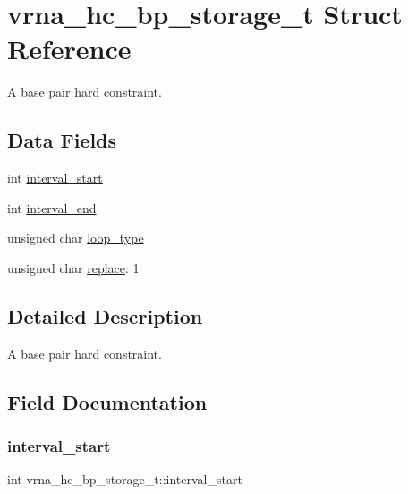 \hypertarget{structvrna__hc__bp__storage__t}{}\section{vrna\+\_\+hc\+\_\+bp\+\_\+storage\+\_\+t Struct Reference}
\label{structvrna__hc__bp__storage__t}


A base pair hard constraint.  


\subsection*{Data Fields}
\begin{DoxyCompactItemize}
\item 
int \mbox{\hyperlink{structvrna__hc__bp__storage__t_a443d13e1e2898e829c8ae71c183174b9}{interval\+\_\+start}}
\item 
int \mbox{\hyperlink{structvrna__hc__bp__storage__t_a5c7b920629beab7c5ec484d70ae7cb00}{interval\+\_\+end}}
\item 
unsigned char \mbox{\hyperlink{structvrna__hc__bp__storage__t_a600013cf429dd0e314f37f716caf9381}{loop\+\_\+type}}
\item 
unsigned char \mbox{\hyperlink{structvrna__hc__bp__storage__t_a0e3c4d41ef287b059ab93cef490f3a8a}{replace}}\+: 1
\end{DoxyCompactItemize}


\subsection{Detailed Description}
A base pair hard constraint. 

\subsection{Field Documentation}
\mbox{\label{structvrna__hc__bp__storage__t_a443d13e1e2898e829c8ae71c183174b9}} 
\subsubsection{\texorpdfstring{interval\+\_\+start}{interval\_start}}
{\footnotesize\ttfamily int vrna\+\_\+hc\+\_\+bp\+\_\+storage\+\_\+t\+::interval\+\_\+start}

